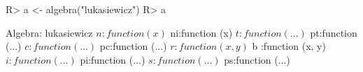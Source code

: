 \begin{Schunk}
% --begin: "lukasiewicz.algebra"
\begin{Sinput}
R> a <- algebra("lukasiewicz")
R> a
\end{Sinput}
\begin{Soutput}
Algebra: lukasiewicz 
 $ n :function (x)  
 $ ni:function (x)  
 $ t :function (...)  
 $ pt:function (...)  
 $ c :function (...)  
 $ pc:function (...)  
 $ r :function (x, y)  
 $ b :function (x, y)  
 $ i :function (...)  
 $ pi:function (...)  
 $ s :function (...)  
 $ ps:function (...)  
\end{Soutput}
%
% --end: "lukasiewicz.algebra"
\end{Schunk}
